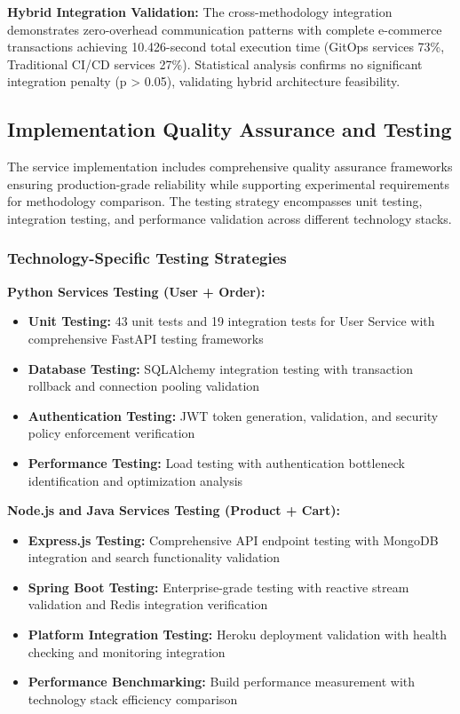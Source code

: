\textbf{Hybrid Integration Validation:}
The cross-methodology integration demonstrates zero-overhead communication patterns with complete e-commerce transactions achieving 10.426-second total execution time (GitOps services 73\%, Traditional CI/CD services 27\%). Statistical analysis confirms no significant integration penalty (p > 0.05), validating hybrid architecture feasibility.

\subsection{Implementation Quality Assurance and Testing}

The service implementation includes comprehensive quality assurance frameworks ensuring production-grade reliability while supporting experimental requirements for methodology comparison. The testing strategy encompasses unit testing, integration testing, and performance validation across different technology stacks.

\subsubsection{Technology-Specific Testing Strategies}

\textbf{Python Services Testing (User + Order):}
\begin{itemize}
\item \textbf{Unit Testing:} 43 unit tests and 19 integration tests for User Service with comprehensive FastAPI testing frameworks
\item \textbf{Database Testing:} SQLAlchemy integration testing with transaction rollback and connection pooling validation
\item \textbf{Authentication Testing:} JWT token generation, validation, and security policy enforcement verification
\item \textbf{Performance Testing:} Load testing with authentication bottleneck identification and optimization analysis
\end{itemize}

\textbf{Node.js and Java Services Testing (Product + Cart):}
\begin{itemize}
\item \textbf{Express.js Testing:} Comprehensive API endpoint testing with MongoDB integration and search functionality validation
\item \textbf{Spring Boot Testing:} Enterprise-grade testing with reactive stream validation and Redis integration verification
\item \textbf{Platform Integration Testing:} Heroku deployment validation with health checking and monitoring integration
\item \textbf{Performance Benchmarking:} Build performance measurement with technology stack efficiency comparison
\end{itemize}

